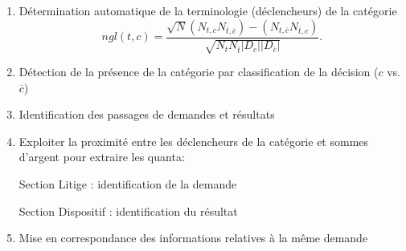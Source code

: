 \begin{frame}[t]{\mysubsectiontitle}
	\begin{enumerate} \scriptsize
		\item Détermination automatique de la terminologie (déclencheurs) de la catégorie \[ngl(t,c) = \frac{\sqrt{N} (N_{t,c} N_{\overline{t},\overline{c}}) - (N_{t,\overline{c}} N_{\overline{t},c})}{\sqrt{N_t N_{\overline{t}} \vert D_c \vert \vert D_{\overline{c}} \vert }}.\]
		\item Détection de la présence de la catégorie par classification de la décision ($c$ vs. $\overline{c}$)
		\item Identification des passages de demandes et résultats 
		\item Exploiter la proximité entre les déclencheurs de la catégorie  et sommes d’argent pour extraire les quanta:
		
		Section Litige : identification de la demande
		
	
	Section Dispositif : identification du résultat
		\item Mise en correspondance des informations relatives à la même demande
	\end{enumerate}
	
\end{frame}
